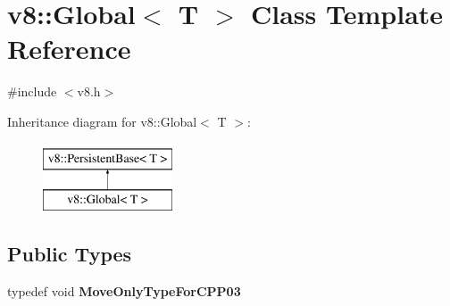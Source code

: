 \hypertarget{classv8_1_1Global}{}\section{v8\+:\+:Global$<$ T $>$ Class Template Reference}
\label{classv8_1_1Global}


{\ttfamily \#include $<$v8.\+h$>$}

Inheritance diagram for v8\+:\+:Global$<$ T $>$\+:\begin{figure}[H]
\begin{center}
\leavevmode
\includegraphics[height=2.000000cm]{classv8_1_1Global}
\end{center}
\end{figure}
\subsection*{Public Types}
\begin{DoxyCompactItemize}
\item 
typedef void {\bfseries Move\+Only\+Type\+For\+C\+P\+P03}\hypertarget{classv8_1_1Global_a295826e79781fe585904e652884db72f}{}\label{classv8_1_1Global_a295826e79781fe585904e652884db72f}

\end{DoxyCompactItemize}
